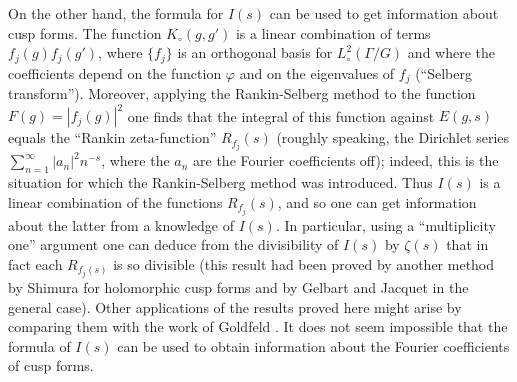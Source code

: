 On the other hand, the formula for $I(s)$ can be used to get information about cusp forms. The function $K_\circ (g,g')$ is a linear combination of terms $f_j (g) f_j (g')$, where $\{f_j\}$ is an orthogonal basis for $L^2_\circ (\Gamma / G)$ and where the coefficients depend on the function $\varphi$ and on the eigenvalues of $f_j$ (``Selberg transform''). Moreover, applying the Rankin-Selberg method to the function $F(g) = |f_j (g)|^2$ one finds that the integral of this function against $E (g,s)$ equals the ``Rankin zeta-function'' $R_{f_j}(s)$ (roughly speaking, the Dirichlet series $\sum\limits^\infty_{n=1} |a_n|^2n^{-s}$, where the $a_n$ are the Fourier coefficients off); indeed, this is the situation for which the Rankin-Selberg method was introduced. Thus $I(s)$ is a linear combination of the functions $R_{f_j}(s)$, and so one can get information about the latter from a knowledge of $I(s)$. In particular, using a ``multiplicity one'' argument one can deduce from the divisibility of $I(s)$ by $\zeta(s)$ that in fact each $R_{f_j(s)}$ is so divisible (this result had been proved by another method by Shimura \cite{art11-8} for holomorphic cusp forms and by Gelbart and Jacquet \cite{art11-2} in the general case). Other applications of the results proved here might arise by comparing them with the work of Goldfeld \cite{art11-1}. It does not seem impossible that the formula of $I(s)$ can be used to obtain information about the Fourier coefficients of cusp forms.

